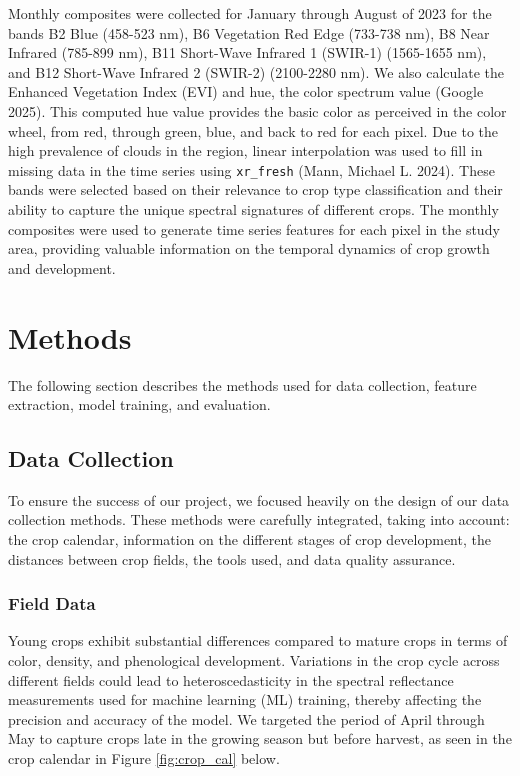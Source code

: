 \documentclass[
  journal,
  twocolumn]{IEEEtran}
\begin{document}
Monthly composites were collected for January through August of 2023 for
the bands B2 Blue (458-523 nm), B6 Vegetation Red Edge (733-738 nm), B8
Near Infrared (785-899 nm), B11 Short-Wave Infrared 1 (SWIR-1)
(1565-1655 nm), and B12 Short-Wave Infrared 2 (SWIR-2) (2100-2280 nm).
We also calculate the Enhanced Vegetation Index (EVI) and hue, the color
spectrum value (Google 2025). This computed hue value provides the basic
color as perceived in the color wheel, from red, through green, blue,
and back to red for each pixel. Due to the high prevalence of clouds in
the region, linear interpolation was used to fill in missing data in the
time series using \texttt{xr\_fresh} (Mann, Michael L. 2024). These
bands were selected based on their relevance to crop type classification
and their ability to capture the unique spectral signatures of different
crops. The monthly composites were used to generate time series features
for each pixel in the study area, providing valuable information on the
temporal dynamics of crop growth and development.

\hypertarget{methods}{%
\section{Methods}\label{methods}}

The following section describes the methods used for data collection,
feature extraction, model training, and evaluation.

\hypertarget{data-collection}{%
\subsection{Data Collection}\label{data-collection}}

To ensure the success of our project, we focused heavily on the design
of our data collection methods. These methods were carefully integrated,
taking into account: the crop calendar, information on the different
stages of crop development, the distances between crop fields, the tools
used, and data quality assurance.

\hypertarget{field-data}{%
\subsubsection{Field Data}\label{field-data}}

Young crops exhibit substantial differences compared to mature crops in
terms of color, density, and phenological development. Variations in the
crop cycle across different fields could lead to heteroscedasticity in
the spectral reflectance measurements used for machine learning (ML)
training, thereby affecting the precision and accuracy of the model. We
targeted the period of April through May to capture crops late in the
growing season but before harvest, as seen in the crop calendar in
Figure \ref{fig:crop_cal} below.
\end{document}
